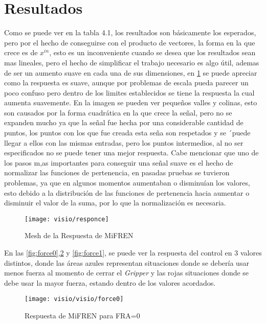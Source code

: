 \section{Resultados}
Como se puede ver en la tabla 4.1, los resultados son básicamente los esperados,  pero por el hecho de conseguirse con el producto de vectores, la forma en la que crece es de $x^{in}$, esto es un inconveniente cuando se desea que los resultados sean mas lineales, pero el hecho de simplificar el trabajo necesario es algo útil, ademas de ser un aumento suave en cada una de sus dimensiones, en \cref{fig:responce} se puede apreciar como la respuesta es suave, aunque por problemas de escala pueda parecer un poco confuso pero dentro de los limites establecidos se tiene la respuesta la cual aumenta suavemente.
En la imagen se pueden ver pequeños valles y colinas, esto son causados por la forma cuadrática en la que crece la señal, pero no se expanden mucho ya que la señal fue hecha por una considerable cantidad de puntos, los puntos con los que fue creada esta seña son respetados y se ´puede llegar a ellos con  las mismas entradas, pero los puntos intermedios, al no ser especificados no se puede tener una mejor respuesta.
Cabe mencionar que uno de los pasos m,as importantes para conseguir una señal suave es el hecho de normalizar las funciones de pertenencia, en pasadas pruebas se tuvieron problemas, ya que en algunos momentos aumentaban o disminuían los valores, esto debido a la distribución de las funciones de pertenencia hacia aumentar o disminuir el valor de la suma, por lo que la normalización es necesaria.

\begin{figure}[h]
	\centering
	\texttt{[image: visio/responce]}
	\caption{Mesh de la Respuesta de MiFREN}
	\label{fig:responce}
\end{figure}




En las \cref{fig:force0},\cref{fig:force05} y \cref{fig:force1}, se puede ver la respuesta del control en 3 valores distintos, donde las áreas azules representan situaciones donde se debería usar menos fuerza al momento de cerrar el \textit{Gripper} y las rojas situaciones donde se debe usar la mayor fuerza, estando dentro de los valores acordados.





\begin{figure}[h]
	\centering
	\texttt{[image: visio/visio/force0]}
	\caption{Respuesta de MiFREN para FRA=0}
	\label{fig:force05}
\end{figure}


